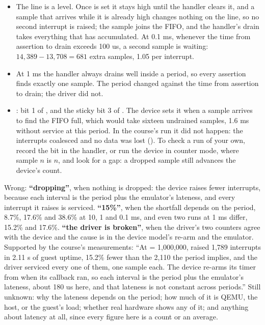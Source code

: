 \begin{itemize}
  \item The line is a level. Once  is set it stays high until the handler clears it,
    and a sample that arrives while it is already high changes nothing on the line, so no second
    interrupt is raised; the sample joins the FIFO, and the handler's drain takes everything that
    has accumulated. At 0.1 ms, whenever the time from assertion to drain exceeds 100 us, a second
    sample is waiting: $14{,}389 - 13{,}708 = 681$ extra samples, 1.05 per interrupt.
  \item At 1 ms the handler always drains well inside a period, so every assertion finds exactly
    one sample. The period changed against the time from assertion to drain; the driver did not.
  \item {}: bit 1 of , and the sticky bit 3 of . The
    device sets it when a sample arrives to find the FIFO full, which would take sixteen undrained
    samples, 1.6 ms without service at this period. In the course's run it did not happen: the
    interrupts coalesced and no data was lost (). To check a run of your own,
    record the bit in the handler, or run the device in counter mode, where sample $n$ is $n$, and
    look for a gap: a dropped sample still advances the device's count.
\end{itemize}

 Wrong: \textbf{``dropping''}, when nothing is dropped: the device raises fewer interrupts,
because each interval is the period plus the emulator's lateness, and every interrupt it raises is
serviced. \textbf{``15\%''}, when the shortfall depends on the period, 8.7\%, 17.6\% and 38.6\% at
10, 1 and 0.1 ms, and even two runs at 1 ms differ, 15.2\% and 17.6\%. \textbf{``the driver is
broken''}, when the driver's two counters agree with the device and the cause is in the device
model's re-arm and the emulator. Supported by the course's measurements: ``At  =
1,000,000,  raised 1,789 interrupts in 2.11 s of guest uptime, 15.2\% fewer than the
2,110 the period implies, and the driver serviced every one of them, one sample each. The device
re-arms its timer from when its callback ran, so each interval is the period plus the emulator's
lateness, about 180 us here, and that lateness is not constant across periods.'' Still unknown: why
the lateness depends on the period; how much of it is QEMU, the host, or the guest's load; whether
real hardware shows any of it; and anything about latency at all, since every figure here is a count
or an average.

